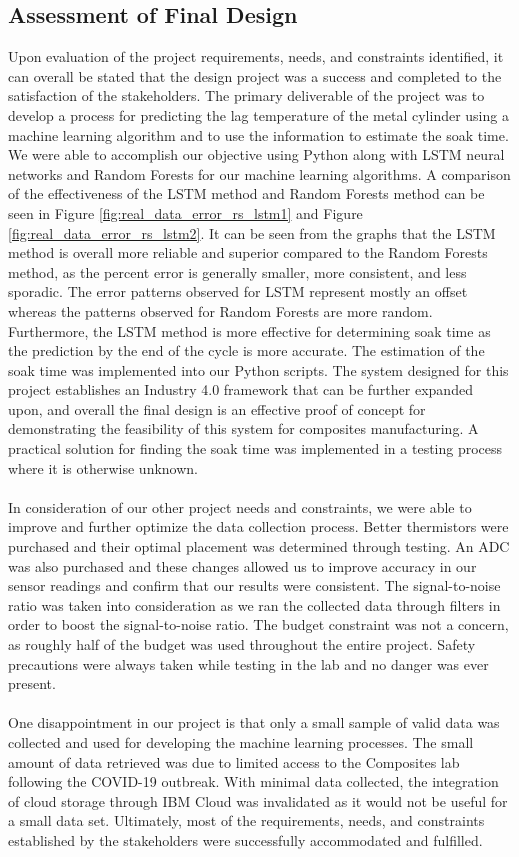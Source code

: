 \subsection{Assessment of Final Design}
Upon evaluation of the project requirements, needs, and constraints identified, it can overall be stated that the design project was a success and completed to the satisfaction of the stakeholders. The primary deliverable of the project was to develop a process for predicting the lag temperature of the metal cylinder using a machine learning algorithm and to use the information to estimate the soak time. We were able to accomplish our objective using Python along with LSTM neural networks and Random Forests for our machine learning algorithms. A comparison of the effectiveness of the LSTM method and Random Forests method can be seen in Figure \ref{fig:real_data_error_rs_lstm1} and Figure \ref{fig:real_data_error_rs_lstm2}. It can be seen from the graphs that the LSTM method is overall more reliable and superior compared to the Random Forests method, as the percent error is generally smaller, more consistent, and less sporadic. The error patterns observed for LSTM represent mostly an offset whereas the patterns observed for Random Forests are more random. Furthermore, the LSTM method is more effective for determining soak time as the prediction by the end of the cycle is more accurate. The estimation of the soak time was implemented into our Python scripts. The system designed for this project establishes an Industry 4.0 framework that can be further expanded upon, and overall the final design is an effective proof of concept for demonstrating the feasibility of this system for composites manufacturing. A practical solution for finding the soak time was implemented in a testing process where it is otherwise unknown.\\\\
In consideration of our other project needs and constraints, we were able to improve and further optimize the data collection process. Better thermistors were purchased and their optimal placement was determined through testing. An ADC was also purchased and these changes allowed us to improve accuracy in our sensor readings and confirm that our results were consistent. The signal-to-noise ratio was taken into consideration as we ran the collected data through filters in order to boost the signal-to-noise ratio. The budget constraint was not a concern, as roughly half of the budget was used throughout the entire project. Safety precautions were always taken while testing in the lab and no danger was ever present. \\\\
One disappointment in our project is that only a small sample of valid data was collected and used for developing the machine learning processes. The small amount of data retrieved was due to limited access to the Composites lab following the COVID-19 outbreak. With minimal data collected, the integration of cloud storage through IBM Cloud was invalidated as it would not be useful for a small data set. Ultimately, most of the requirements, needs, and constraints established by the stakeholders were successfully accommodated and fulfilled. 

